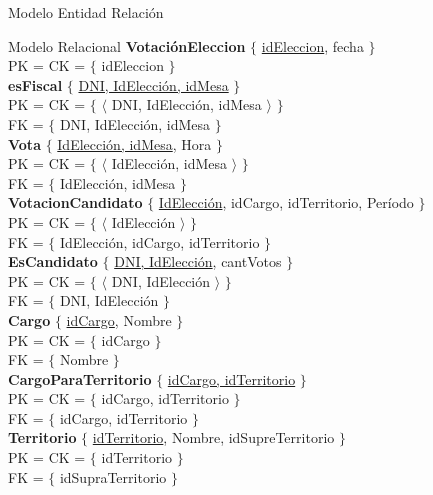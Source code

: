 \begin{section}{Modelo Entidad Relaci\'on}
\begin{subsection}{Modelo Relacional}
\textbf{Votaci\'onEleccion} $ \lbrace $ \underline{idEleccion}, fecha $ \rbrace $ \\
PK = CK = $ \lbrace $ idEleccion $ \rbrace $ \\

\textbf{esFiscal} $ \lbrace $ \underline{DNI, IdElecci\'on, idMesa} $ \rbrace $ \\
PK = CK = $ \lbrace $ $ \langle $ DNI, IdElecci\'on, idMesa $ \rangle $ $ \rbrace $ \\
FK = $ \lbrace $ DNI, IdElecci\'on, idMesa $ \rbrace $\\

\textbf{Vota} $ \lbrace $ \underline{IdElecci\'on, idMesa}, Hora $ \rbrace $ \\
PK = CK = $ \lbrace $ $ \langle $ IdElecci\'on, idMesa $ \rangle $ $ \rbrace $ \\
FK = $ \lbrace $ IdElecci\'on, idMesa $ \rbrace $\\

\textbf{VotacionCandidato} $ \lbrace $ \underline{IdElecci\'on}, idCargo, idTerritorio, Per\'iodo $ \rbrace $ \\
PK = CK = $ \lbrace $ $ \langle $ IdElecci\'on $ \rangle $ $ \rbrace $ \\
FK = $ \lbrace $ IdElecci\'on, idCargo, idTerritorio $ \rbrace $\\

\textbf{EsCandidato} $ \lbrace $ \underline{DNI, IdElecci\'on}, cantVotos $ \rbrace $ \\
PK = CK = $ \lbrace $ $ \langle $ DNI, IdElecci\'on $ \rangle $ $ \rbrace $ \\
FK = $ \lbrace $ DNI, IdElecci\'on $ \rbrace $\\

\textbf{Cargo} $ \lbrace $ \underline{idCargo}, Nombre $ \rbrace $ \\
PK = CK = $ \lbrace $ idCargo $ \rbrace $ \\
FK = $ \lbrace $ Nombre $ \rbrace $\\

\textbf{CargoParaTerritorio} $ \lbrace $ \underline{idCargo, idTerritorio} $ \rbrace $ \\
PK = CK = $ \lbrace $ idCargo, idTerritorio $ \rbrace $ \\
FK = $ \lbrace $ idCargo, idTerritorio $ \rbrace $\\

\textbf{Territorio} $ \lbrace $ \underline{idTerritorio}, Nombre, idSupreTerritorio $ \rbrace $ \\
PK = CK = $ \lbrace $ idTerritorio $ \rbrace $ \\
FK = $ \lbrace $ idSupraTerritorio $ \rbrace $\\


\end{subsection}

\end{section}
